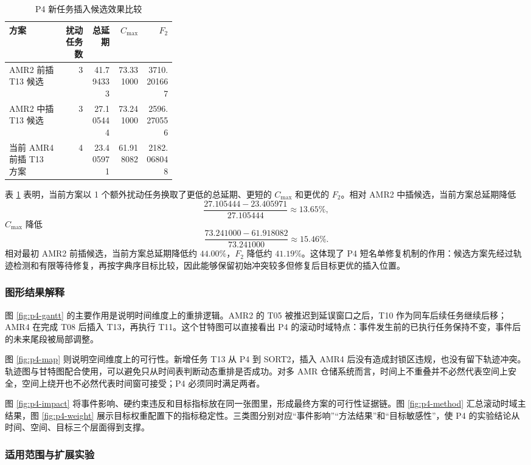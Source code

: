 \begin{table}[H]
\centering
\small
\begin{tabular}{p{0.32\linewidth}rrrr}
\toprule
方案 & 扰动任务数 & 总延期 & $C_{\max}$ & $F_2$ \\
\midrule
AMR2 前插 T13 候选 & 3 & 41.794333 & 73.331000 & 3710.201667 \\
AMR2 中插 T13 候选 & 3 & 27.105444 & 73.241000 & 2596.270556 \\
当前 AMR4 前插 T13 方案 & 4 & 23.405971 & 61.918082 & 2182.068048 \\
\bottomrule
\end{tabular}
\caption{P4 新任务插入候选效果比较}
\label{tab:p4-candidate-compare}
\end{table}

表 \ref{tab:p4-candidate-compare} 表明，当前方案以 1 个额外扰动任务换取了更低的总延期、更短的 $C_{\max}$ 和更优的 $F_2$。相对 AMR2 中插候选，当前方案总延期降低
\[
\frac{27.105444-23.405971}{27.105444}\approx 13.65\%,
\]
$C_{\max}$ 降低
\[
\frac{73.241000-61.918082}{73.241000}\approx 15.46\%.
\]
相对最初 AMR2 前插候选，当前方案总延期降低约 $44.00\%$，$F_2$ 降低约 $41.19\%$。这体现了 P4 短名单修复机制的作用：候选方案先经过轨迹检测和有限等待修复，再按字典序目标比较，因此能够保留初始冲突较多但修复后目标更优的插入位置。

\subsubsection{图形结果解释}

图 \ref{fig:p4-gantt} 的主要作用是说明时间维度上的重排逻辑。AMR2 的 T05 被推迟到延误窗口之后，T10 作为同车后续任务继续后移；AMR4 在完成 T08 后插入 T13，再执行 T11。这个甘特图可以直接看出 P4 的滚动时域特点：事件发生前的已执行任务保持不变，事件后的未来尾段被局部调整。

图 \ref{fig:p4-map} 则说明空间维度上的可行性。新增任务 T13 从 P4 到 SORT2，插入 AMR4 后没有造成封锁区违规，也没有留下轨迹冲突。轨迹图与甘特图配合使用，可以避免只从时间表判断动态重排是否成功。对多 AMR 仓储系统而言，时间上不重叠并不必然代表空间上安全，空间上绕开也不必然代表时间窗可接受；P4 必须同时满足两者。

图 \ref{fig:p4-impact} 将事件影响、硬约束违反和目标指标放在同一张图里，形成最终方案的可行性证据链。图 \ref{fig:p4-method} 汇总滚动时域主结果，图 \ref{fig:p4-weight} 展示目标权重配置下的指标稳定性。三类图分别对应“事件影响”“方法结果”和“目标敏感性”，使 P4 的实验结论从时间、空间、目标三个层面得到支撑。

\subsubsection{适用范围与扩展实验}

